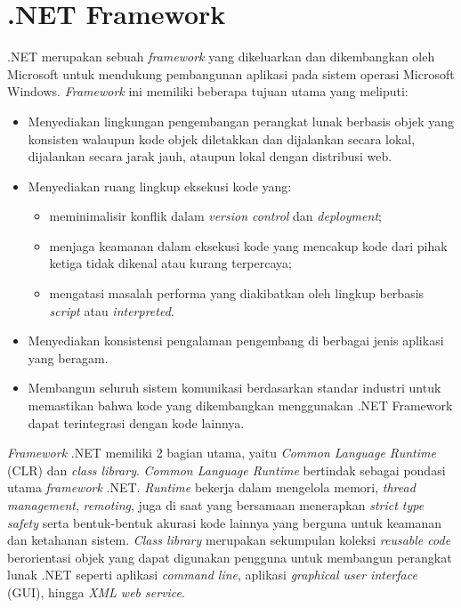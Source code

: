 \section{.NET Framework}
\label{sec:skripsi}
.NET merupakan sebuah \textit{framework} yang dikeluarkan dan dikembangkan oleh Microsoft untuk mendukung pembangunan aplikasi pada sistem operasi Microsoft Windows. \textit{Framework} ini memiliki beberapa tujuan utama yang meliputi:
\begin{itemize}
    \item Menyediakan lingkungan pengembangan perangkat lunak berbasis objek yang konsisten walaupun kode objek diletakkan dan dijalankan secara lokal, dijalankan secara jarak jauh, ataupun lokal dengan distribusi web.
    \item Menyediakan ruang lingkup eksekusi kode yang:
        \begin{itemize}
            \item meminimalisir konflik dalam \textit{version control} dan \textit{deployment};
            \item menjaga keamanan dalam eksekusi kode yang mencakup kode dari pihak ketiga tidak dikenal atau kurang terpercaya;
            \item mengatasi masalah performa yang diakibatkan oleh lingkup berbasis \textit{script} atau \textit{interpreted}.
        \end{itemize}
    \item Menyediakan konsistensi pengalaman pengembang di berbagai jenis aplikasi yang beragam.
    \item Membangun seluruh sistem komunikasi berdasarkan standar industri untuk memastikan bahwa kode yang dikembangkan menggunakan .NET Framework dapat terintegrasi dengan kode lainnya.
\end{itemize}

\textit{Framework} .NET memiliki 2 bagian utama, yaitu \textit{Common Language Runtime} (CLR) dan \textit{class library}. \textit{Common Language Runtime} bertindak sebagai pondasi utama \textit{framework} .NET. \textit{Runtime} bekerja dalam mengelola memori, \textit{thread management}, \textit{remoting}, juga di saat yang bersamaan menerapkan \textit{strict type safety} serta bentuk-bentuk akurasi kode lainnya yang berguna untuk keamanan dan ketahanan sistem. \textit{Class library} merupakan sekumpulan koleksi \textit{reusable code} berorientasi objek yang dapat digunakan pengguna untuk membangun perangkat lunak .NET seperti aplikasi \textit{command line}, aplikasi \textit{graphical user interface} (GUI), hingga \textit{XML web service}.

